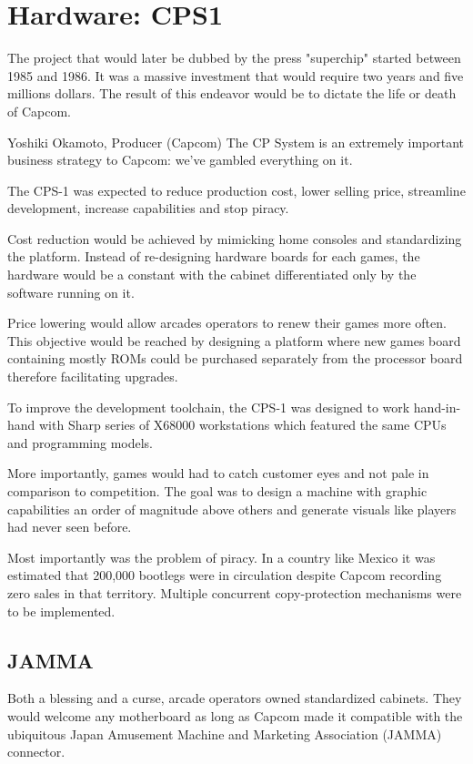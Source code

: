 \chapter{Hardware: CPS1}

The project that would later be dubbed by the press "superchip"\cite{tgm198906} started between 1985 and 1986. It was a massive investment that would require two years and five millions dollars. The result of this endeavor would be to dictate the life or death of Capcom.

\begin{q}{Yoshiki Okamoto, Producer (Capcom)\cite{gamest38}}
The CP System is an extremely important business strategy to Capcom: we’ve gambled everything on it.
\end{q}

The CPS-1 was expected to reduce production cost, lower selling price, streamline development, increase capabilities and stop piracy. 

Cost reduction would be achieved by mimicking home consoles and standardizing the platform. Instead of re-designing hardware boards for each games, the hardware would be a constant with the cabinet differentiated only by the software running on it.

Price lowering would allow arcades operators to renew their games more often. This objective would be reached by designing a platform where new games board containing mostly ROMs could be purchased separately from the processor board therefore facilitating upgrades.

To improve the development toolchain, the CPS-1 was designed to work hand-in-hand with Sharp series of X68000 workstations which featured the same CPUs and programming models.

More importantly, games would had to catch customer eyes and not pale in comparison to competition. The goal was to design a machine with graphic capabilities an order of magnitude above others and generate visuals like players had never seen before.

Most importantly was the problem of piracy. In a country like Mexico it was estimated that 200,000 bootlegs were in circulation\cite{sf2_oral_history} despite Capcom recording zero sales in that territory. Multiple concurrent copy-protection mechanisms were to be implemented.


\section{JAMMA}
Both a blessing and a curse, arcade operators owned  standardized cabinets. They would welcome any motherboard as long as Capcom made it compatible with the ubiquitous Japan Amusement Machine and Marketing Association (JAMMA) connector. 

